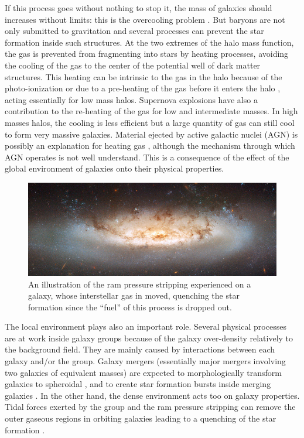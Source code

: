 If this process goes without nothing to stop it, the mass of galaxies should
increases without limits: this is the overcooling problem \citep{White+78}. But
baryons are not only submitted to gravitation and several processes can prevent
the star formation inside such structures. At the two extremes of the halo mass
function, the gas is prevented from fragmenting into stars by heating
processes, avoiding the cooling of the gas to the center of the potential well
of dark matter structures. This heating can be intrinsic to the gas in the halo
because of the photo-ionization \citep{Rees+86} or due to a pre-heating of the
gas before it enters the halo \citep{Borgani+01}, acting essentially for low
mass halos. Supernova explosions have also a contribution to the re-heating of
the gas \citep{Dekel+86, Efstathiou+00} for low and intermediate masses. In
high masses halos, the cooling is less efficient but a large quantity of gas
can still cool to form very massive galaxies. Material ejected by active
galactic nuclei (AGN) is possibly an explanation for heating gas
\citep{Silk+98}, although the mechanism through which AGN operates is not well
understand. This is a consequence of the effect of the global environment of
galaxies onto their physical properties.
%
\begin{figure}[htb]
    \centering
    \includegraphics[width=\linewidth]{chapters/images/rampressure.jpg}
    \caption{An illustration of the ram pressure stripping experienced on a
    galaxy, whose interstellar gas in moved, quenching the star formation since
the ``fuel'' of this process is dropped out.\label{fig:rampressure}}
\end{figure}

The local environment plays also an important role. Several physical processes
are at work inside galaxy groups because of the galaxy over-density relatively
to the background field. They are mainly caused by interactions between each
galaxy and/or the group. Galaxy mergers (essentially major mergers involving
two galaxies of equivalent masses) are expected to morphologically transform
galaxies to spheroidal \citep{Naab+99,Bournaud+05}, and to create star
formation bursts inside merging galaxies \citep{Cox+08,Teyssier+10}. In the
other hand, the dense environment acts too on galaxy properties. Tidal forces
exerted by the group and the ram pressure stripping can remove the outer
gaseous regions in orbiting galaxies leading to a quenching of the star
formation \citep{Larson+80,Bekki+13}.

